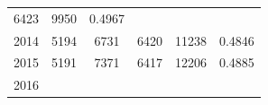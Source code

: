 \documentclass[10pt,]{article}
\begin{document}
\begin{longtable}[]{@{}cccccc@{}}
\begin{minipage}[t]{0.17\columnwidth}
6423\strut
\end{minipage} & \begin{minipage}[t]{0.14\columnwidth}\centering\strut
9950\strut
\end{minipage} & \begin{minipage}[t]{0.10\columnwidth}\centering\strut
0.4967\strut
\end{minipage}\tabularnewline
\begin{minipage}[t]{0.07\columnwidth}\centering\strut
2014\strut
\end{minipage} & \begin{minipage}[t]{0.19\columnwidth}\centering\strut
5194\strut
\end{minipage} & \begin{minipage}[t]{0.16\columnwidth}\centering\strut
6731\strut
\end{minipage} & \begin{minipage}[t]{0.17\columnwidth}\centering\strut
6420\strut
\end{minipage} & \begin{minipage}[t]{0.14\columnwidth}\centering\strut
11238\strut
\end{minipage} & \begin{minipage}[t]{0.10\columnwidth}\centering\strut
0.4846\strut
\end{minipage}\tabularnewline
\begin{minipage}[t]{0.07\columnwidth}\centering\strut
2015\strut
\end{minipage} & \begin{minipage}[t]{0.19\columnwidth}\centering\strut
5191\strut
\end{minipage} & \begin{minipage}[t]{0.16\columnwidth}\centering\strut
7371\strut
\end{minipage} & \begin{minipage}[t]{0.17\columnwidth}\centering\strut
6417\strut
\end{minipage} & \begin{minipage}[t]{0.14\columnwidth}\centering\strut
12206\strut
\end{minipage} & \begin{minipage}[t]{0.10\columnwidth}\centering\strut
0.4885\strut
\end{minipage}\tabularnewline
\begin{minipage}[t]{0.07\columnwidth}\centering\strut
2016\strut
\end{minipage} & \begin{minipage}[t]{0.19\columnwidth}\centering\strut

\end{minipage}
\end{longtable}
\end{document}
